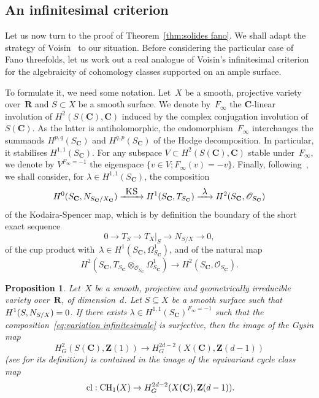 \documentclass[JEP,XML,SOM,Unicode]{cedram}
\newcommand{\To}[1]{\mathchoice{\xrightarrow{\textstyle\kern4pt#1\kern3pt}}{\stackrel{#1}{\longrightarrow}}{}{}}
\theoremstyle{plain}
\newtheorem{prop}[thm]{Proposition}
\theoremstyle{definition}
\numberwithin{equation}{section}
\newcommand{\cl}{{\mathrm{cl}}}
\newcommand{\sO}{{\mathscr O}}
\renewcommand{\C}{{\mathbf C}}
\newcommand{\R}{{\mathbf R}}
\newcommand{\Z}{{\mathbf Z}}
\newcommand{\CH}{\mathrm{CH}}
\newcommand{\KS}{\textsc{KS}}
\begin{document}
\subsection{An infinitesimal criterion}
\label{subsec:an infinitesimal criterion}

Let us now turn to the proof of Theorem~\ref{thm:solides fano}.
We shall adapt the strategy of Voisin~\cite{voisinthreefolds} to our situation.
Before considering the particular case of Fano threefolds, let us work out a real analogue of
Voisin's infinitesimal criterion \cite[, Prop.\,1]{voisinthreefolds}
for the algebraicity of cohomology classes supported on an ample surface.

To formulate it, we need some notation.
Let~$X$ be a smooth, projective variety over~$\R$
and $S \subset X$ be a smooth surface.
We denote by~$F_\infty$
the $\C$\nobreakdash-linear involution
of $H^2(S(\C),\C)$
induced by the complex conjugation involution of~$S(\C)$.
As the latter is antiholomorphic,
the endomorphism~$F_\infty$
interchanges
the summands $H^{p,q}(S_{\C})$ and $H^{q,p}(S_{\C})$ of the Hodge decomposition.
In particular, it stabilises $H^{1,1}(S_{\C})$.
For any subspace $V \subset H^2(S(\C),\C)$ stable under~$F_\infty$,
we denote by $V^{F_\infty=-1}$ the eigenspace $\{v \in V;F_\infty(v)=-v\}$.
Finally,
following~\cite[]{voisinthreefolds}, we shall consider,
for $\lambda \in H^{1,1}(S_\C)$,
the composition
\begin{equation}
\label{eq:variation infinitesimale}
H^0(S_\C,N_{S_\C/X_\C})\To{\KS}
H^1(S_\C,T_{S_\C})\To{\lambda}
H^2(S_\C,\sO_{S_\C})
\end{equation}
of the Kodaira-Spencer map,
which is by definition the boundary of the short exact sequence
\[
0\to T_S \to T_X|_S \to N_{S/X} \to 0,
\]
of the cup product with~$\lambda \in H^1(S_\C,\Omega^1_{S_\C})$,
and of the natural map
\[
H^2(S_\C,T_{S_\C} \otimes_{\sO_{S_\C}} \Omega^1_{S_\C}) \to H^2(S_\C,\sO_{S_\C}).
\]

\begin{prop}
\label{prop:critere infinitesimal}
Let~$X$ be a smooth, projective and geometrically irreducible variety over~$\R$,
of dimension~$d$.
Let $S \subseteq X$ be a smooth surface
such that $H^1(S,N_{S/X})=\nobreak0$.
If there exists $\lambda\in H^{1,1}(S_{\C})^{F_\infty=-1}$ such that the
composition~\eqref{eq:variation infinitesimale}
is surjective,
then the image of the Gysin map
\[
H^2_G(S(\C),\Z(1)) \to H^{2d-2}_G(X(\C),\Z(d-1))
\]
(see \cite[(\ref*{BW1-eq:pushforward equivariant complex})]{BW1} for its definition)
is contained in the image of the equivariant cycle class map
\[
\cl:\CH_1(X) \to H^{2d-2}_G(X(\C),\Z(d-1))\rlap{.}
\]
\end{prop}
\end{document}
